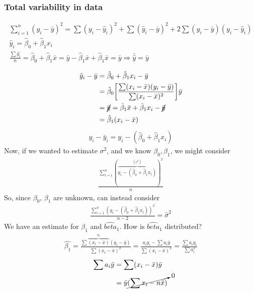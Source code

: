 \subsubsection*{Total variability in data}
\begin{gather*}
	\sum_{i=1}^n (y_i - \bar{y})^2 = \sum (y_i - \hat{y}_i)^2 + \sum (\hat{y}_i - \bar{y})^2 + 2 \sum (y_i - \bar{y}) (y_i - \hat{y}_i)\\
	\hat{y}_i = \hat{\beta}_0 + \hat{\beta}_1 x_i\\
	\frac{\sum \hat{y_i}}{n} = \hat{\beta}_0 + \hat{\beta}_1 \bar{x} = \bar{y} - \hat{\beta}_1 \bar{x} + \hat{\beta}_1 \bar{x} = \bar{y} \Rightarrow \boxed{\bar{\hat{y}} = \bar{y}}\\
\end{gather*}
\begin{align*}
	\hat{y}_i - \bar{y} & = \hat{\beta}_0 + \hat{\beta}_1 x_i - \bar{y}\\
	& = \hat{\beta}_0 \bigg[ \frac{\sum (x_i - \bar{x}) (y_i - \bar{y})}{\sum (x_i - \bar{x})^2} \bigg] \bar{y}\\
	& = \cancel{\bar{y}} = \hat{\beta}_1 \bar{x} + \hat{\beta}_1 x_i - \cancel{\bar{y}}\\
	& = \hat{\beta}_1 (x_i - \bar{x})
\end{align*}
\begin{gather*}
	y_i - \bar{y}_i = y_i - (\hat{\beta}_0 + \hat{\beta}_1 x_i)
\end{gather*}
Now, if we wanted to estimate $\sigma^2$, and we know $\beta_0, \beta_1$, we might consider
\begin{gather*}
	\frac{\sum\limits_{i=1}^n (\overbrace{y_i - (\hat{\beta}_0 + \hat{\beta}_1 x_i)}^{(\epsilon^2)})^2}{n}
\end{gather*}
So, since $\beta_0$, $\beta_1$ are unknown, can instead consider
\begin{gather*}
	\frac{\sum\limits_{i=1}^n (y_i - (\hat{\beta}_0 + \hat{\beta}_1 x_i))^2}{n - 2} = \hat{\sigma}^2
\end{gather*}
We have an estimate for $\beta_1$ and $\hat{beta}_1$. How is $\hat{beta}_1$ distributed?
\begin{gather*}
	\hat{\beta_1} = \frac{\sum \overbrace{(x_i - \bar{x})}^{a_i} (y_i - \bar{y})}{\sum (x_i - \bar{x})^2} = \frac{a_i y_i - \boxed{\sum a_i \bar{y}}}{\sum (x_i - \bar{x})^2} = \frac{\sum a_i y_i}{\sum a_i^2}
\end{gather*}
\begin{align*}
	\sum a_i \bar{y} & = \sum (x_i - \bar{x})\bar{y}\\
	& = \bar{y} \cancelto{0}{(\sum x_i - n\bar{x})}
\end{align*}
